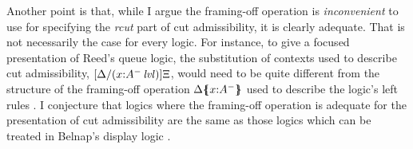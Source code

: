 Another point is that, while I argue the framing-off operation 
is {\it inconvenient} to use for specifying the {\it rcut} part
of cut admissibility, it is clearly adequate. That is not necessarily
the case for every logic. For instance, to give a focused presentation
of Reed's queue logic, the substitution of contexts used to describe
cut admissibility, $[\Delta/(x{:}{A^-}\,{{\it lvl}})]\Xi$, would need to be
quite different from the structure of the framing-off operation
${\Delta}\mbox{$\{\hspace{-4pt}\{$}{x{:}A^-}\mbox{$\}\hspace{-4pt}\}$}$ used to describe the logic's left rules
\cite{reed09queue}.
I conjecture that logics where the framing-off operation is adequate
for the presentation of cut admissibility are the same as those
logics which can be treated in Belnap's display logic \cite{belnap82display}.


